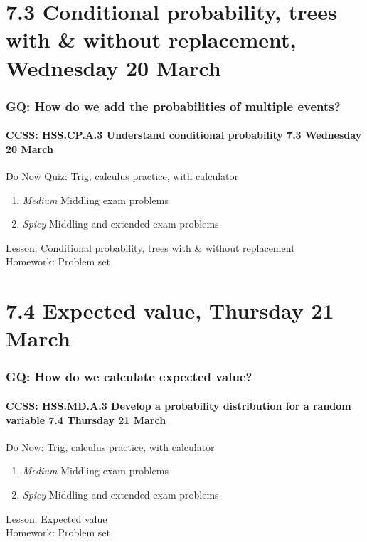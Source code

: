 \documentclass{beamer}
\begin{document}
\section{7.3 Conditional probability, trees with \& without replacement, Wednesday 20 March}
  \frame
  {
    \frametitle{GQ: How do we add the probabilities of multiple events?}
    \framesubtitle{CCSS: HSS.CP.A.3 Understand conditional probability \hfill \alert{7.3 Wednesday 20 March}}

    \begin{block}{Do Now Quiz: Trig, calculus practice, with calculator}
    \begin{enumerate}
        \item \emph{Medium} Middling exam problems
        \item \emph{Spicy} Middling and extended exam problems
    \end{enumerate}
    \end{block}

    Lesson: Conditional probability, trees with \& without replacement \\
    Homework: Problem set
  }

\section{7.4 Expected value, Thursday 21 March}
  \frame
  {
    \frametitle{GQ: How do we calculate expected value?}
    \framesubtitle{CCSS: HSS.MD.A.3 Develop a probability distribution for a random variable \hfill \alert{7.4 Thursday 21 March}}

    \begin{block}{Do Now: Trig, calculus practice, with calculator}
    \begin{enumerate}
        \item \emph{Medium} Middling exam problems
        \item \emph{Spicy} Middling and extended exam problems
    \end{enumerate}
    \end{block}

    Lesson: Expected value \\
    Homework: Problem set
  }
\end{document}

